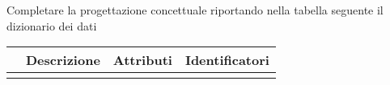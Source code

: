 \begin{templateblock}
    Completare la progettazione concettuale riportando nella tabella seguente
    il dizionario dei dati
\end{templateblock}

\begin{tabularx}{\linewidth}{|l|X|l|l|}
    \hline
    \rowcolor{tblhdrcolor}
    \multicolumn{1}{|c|}{\textbf{Entità}}
     & \multicolumn{1}{|c|}{\textbf{Descrizione}}
     & \multicolumn{1}{|c|}{\textbf{Attributi}}
     & \multicolumn{1}{|c|}{\textbf{Identificatori}}
    \\\hline
    \hfill
     & \hfill
     & \hfill
     & \hfill
    \\ \hline
\end{tabularx}
